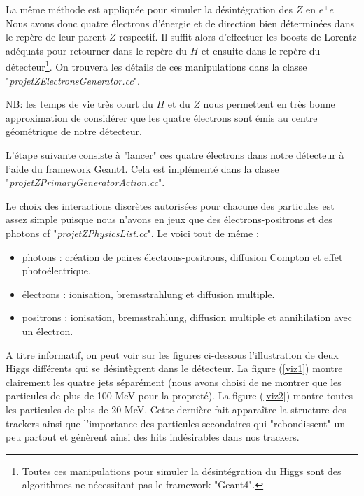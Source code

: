 \documentclass[11pt]{article}
\begin{document}
La même méthode est appliquée pour simuler la désintégration des $Z$ en
$e^+e^-$ Nous avons donc quatre électrons d'énergie et de direction bien
déterminées dans le repère de leur parent $Z$ respectif. Il suffit alors
d'effectuer les boosts de Lorentz adéquats pour retourner dans le repère du $H$
et ensuite dans le repère du détecteur\footnote{Toutes ces manipulations pour
simuler la désintégration du Higgs sont des algorithmes ne nécessitant pas le
framework "Geant4".}. On trouvera les détails de ces manipulations dans la
classe "\textit{projetZElectronsGenerator.cc}".

NB: les temps de vie très court
du $H$ et du $Z$ nous permettent en très bonne approximation de considérer que
les quatre électrons sont émis au centre géométrique de notre détecteur. 

L'étape
suivante consiste à "lancer" ces quatre électrons dans notre détecteur à l'aide
du framework Geant4. Cela est implémenté dans la classe
"\textit{projetZPrimaryGeneratorAction.cc}".

Le choix des interactions discrètes autorisées pour chacune des particules est
assez simple puisque nous n'avons en jeux que des électrons-positrons et des
photons cf "\textit{projetZPhysicsList.cc}". Le voici tout de même : 
\begin{itemize}
\item photons : création de paires électrons-positrons, diffusion Compton et
effet photoélectrique.
\item électrons : ionisation, bremsstrahlung et diffusion multiple.
\item positrons : ionisation, bremsstrahlung, diffusion multiple et
annihilation avec un électron.\\ 
\end{itemize}

A titre informatif, on peut voir sur les figures ci-dessous l'illustration de
deux Higgs différents qui se désintègrent dans le détecteur.
La figure (\ref{viz1}) montre clairement les quatre jets séparément (nous avons
choisi de ne montrer que les particules de plus de 100 MeV pour la propreté). La
figure (\ref{viz2}) montre toutes les particules de plus de 20 MeV. Cette
dernière fait apparaître la structure des trackers ainsi que l'importance des
particules secondaires qui "rebondissent" un peu partout et génèrent ainsi
des hits indésirables dans nos trackers.
\end{document}
